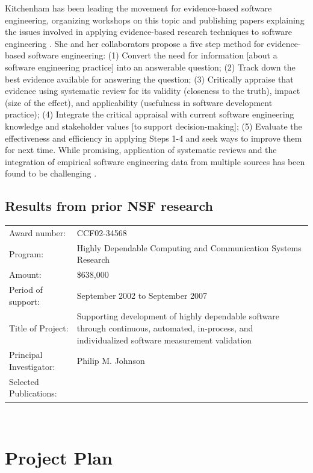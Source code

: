 Kitchenham has been leading the movement for evidence-based software
engineering, organizing workshops on this topic and publishing papers
explaining the issues involved in applying evidence-based research
techniques to software engineering \cite{Kitchenham04,Kitchenham04a}.  She
and her collaborators propose a five step method for evidence-based
software engineering: (1) Convert the need for information [about a
software engineering practice] into an answerable question; (2) Track down
the best evidence available for answering the question; (3) Critically
appraise that evidence using systematic review for its validity (closeness
to the truth), impact (size of the effect), and applicability (usefulness
in software development practice); (4) Integrate the critical appraisal
with current software engineering knowledge and stakeholder values [to
support decision-making]; (5) Evaluate the effectiveness and efficiency in
applying Steps 1-4 and seek ways to improve them for next time.  While
promising, application of systematic reviews and the integration of
empirical software engineering data from multiple sources has been found to
be challenging \cite{Jedlitschka04}.

\subsection{Results from prior NSF research}

\begin{tabular}{lp{4.5in}}

Award number: & CCF02-34568 \\
Program: & Highly Dependable Computing and Communication Systems Research\\
Amount: & \$638,000 \\
Period of support: & September 2002 to September 2007 \\
Title of Project: & Supporting development of highly dependable software through
continuous, automated, in-process, and individualized software measurement validation \\
Principal Investigator: & Philip M. Johnson \\
Selected Publications: & \cite{csdl2-04-22,csdl2-04-13,csdl2-04-11,csdl2-03-12,
csdl2-02-07,csdl2-03-07,csdl2-04-02,csdl2-04-04,csdl2-04-06}
\end{tabular} \\ %


\section{Project Plan}

